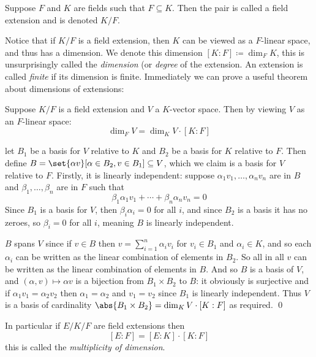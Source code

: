 \bdefn

    Suppose $F$ and $K$ are fields such that $F\subseteq K$.
    Then the pair is called a {\emphcolor field extension} and is denoted $K/F$.

\edefn

Notice that if $K/F$ is a field extension, then $K$ can be viewed as a $F$-linear space, and thus has a dimension.
We denote this dimension $[K:F]\coloneqq\dim_FK$, this is unsurprisingly called the {\it dimension} (or {\it degree} of the extension.
An extension is called {\it finite} if its dimension is finite.
Immediately we can prove a useful theorem about dimensions of extensions:

\bthrm

    Suppose $K/F$ is a field extension and $V$ a $K$-vector space.
    Then by viewing $V$ as an $F$-linear space:
    $$ \dim_FV = \dim_KV\cdot[K:F] $$

\ethrm

\Proof let $B_1$ be a basis for $V$ relative to $K$ and $B_2$ be a basis for $K$ relative to $F$.
Then define $B=\set{\alpha v}[\alpha\in B_2,v\in B_1]\subseteq V$, which we claim is a basis for $V$ relative to $F$.
Firstly, it is linearly independent: suppose $\alpha_1v_1,\dots,\alpha_nv_n$ are in $B$ and $\beta_1,\dots,\beta_n$ are in $F$ such that
$$ \beta_1\alpha_1v_1 + \cdots + \beta_n\alpha_nv_n = 0 $$
Since $B_1$ is a basis for $V$, then $\beta_i\alpha_i=0$ for all $i$, and since $B_2$ is a basis it has no zeroes, so $\beta_i=0$ for all $i$, meaning $B$ is linearly independent.

$B$ spans $V$ since if $v\in B$ then $v=\sum_{i=1}^n\alpha_iv_i$ for $v_i\in B_1$ and $\alpha_i\in K$, and so each $\alpha_i$ can be written as the linear combination of elements in $B_2$.
So all in all $v$ can be written as the linear combination of elements in $B$.
And so $B$ is a basis of $V$, and $(\alpha,v)\mapsto\alpha v$ is a bijection from $B_1\times B_2$ to $B$: it obviously is surjective and if $\alpha_1v_1=\alpha_2v_2$ then $\alpha_1=\alpha_2$ and $v_1=v_2$
since $B_1$ is linearly independent.
Thus $V$ is a basis of cardinality $\abs{B_1\times B_2}=\dim_KV\cdot[K:F]$ as required.
\qed

In particular if $E/K/F$ are field extensions then
$$ [E:F] = [E:K]\cdot[K:F] $$
this is called the {\it multiplicity of dimension}.

